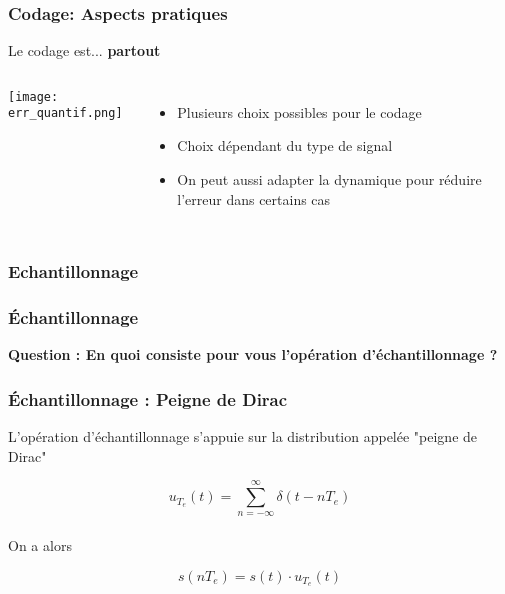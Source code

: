 \documentclass{beamer}
\begin{document}
\begin{frame}
\frametitle{Codage: Aspects pratiques}
Le codage est... \textbf{partout}\\
\begin{columns}
\column{60mm}
\texttt{[image: err\_quantif.png]}\\
\column{60mm}
\begin{itemize}
\item Plusieurs choix possibles pour le codage
\vspace{0.1cm}
\item Choix dépendant du type de signal
\vspace{0.1cm}
\item On peut aussi adapter la dynamique pour réduire l'erreur dans certains cas
\end{itemize}
\end{columns}
\end{frame}


\subsubsection{Echantillonnage} 
\begin{frame} 
\frametitle{\'Echantillonnage} 

\textbf{Question : En quoi consiste pour vous l'opération d'échantillonnage ?}\\
\vspace{0.5cm}
\end{frame}

\begin{frame}
\frametitle{\'Echantillonnage : Peigne de Dirac}

L'opération d'échantillonnage s'appuie sur la distribution appelée "peigne de Dirac"\\

\vspace{0.7cm} 

 \[ u_{T_e}(t) = \sum_{n = -\infty}^{\infty} \delta(t-nT_e) \]\\
 
\vspace{0.7cm}
On a alors\\

\vspace{0.3cm}

 \[\boxed{s(nT_e) = s(t) \cdot u_{T_e}(t)}\]
\end{frame}
\end{document}
